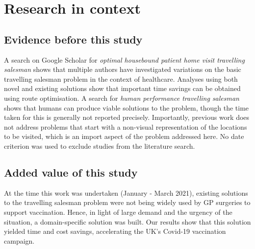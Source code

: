 \documentclass[review]{elsarticle}
\def\vm{VaxiMap}
\begin{document}
\begin{frontmatter}
\begin{abstract}
\paragraph{Interpretation} The adoption of \vm{} yielded both time and cost savings for GP surgeries and accelerated the UK's Covid-19 vaccination campaign at a critical moment. 

\paragraph{Funding} Financial support for \vm{} was provided by Magdalen College, Oxford, Oxford University Innovation, and JHubMed, part of UK Strategic Command. These parties were not involved in the preparation of this manuscript. 

\begin{keyword}
vaccination \sep covid-19 \sep housebound \sep optimisation \sep travelling salesman
\end{keyword}

\end{abstract}

\end{frontmatter}

\linenumbers

\section{Research in context} 

\subsection{Evidence before this study} A search on Google Scholar for \textit{optimal housebound patient home visit travelling salesman} shows that multiple authors have investigated variations on the basic travelling salesman problem in the context of healthcare. Analyses using both novel and existing solutions show that important time savings can be obtained using route optimisation. A search for \textit{human performance travelling salesman} shows that humans can produce viable solutions to the problem, though the time taken for this is generally not reported precisely. Importantly, previous work does not address problems that start with a non-visual representation of the locations to be visited, which is an import aspect of the problem addressed here. No date criterion was used to exclude studies from the literature search. 

\subsection{Added value of this study} At the time this work was undertaken (January - March 2021), existing solutions to the travelling salesman problem were not being widely used by GP surgeries to support vaccination. Hence, in light of large demand and the urgency of the situation, a domain-specific solution was built. Our results show that this solution yielded time and cost savings, accelerating the UK's Covid-19 vaccination campaign. 
\end{document}
